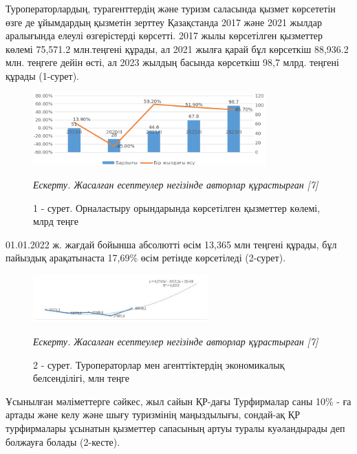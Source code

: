 \begin{multicols}{2}
Туроператорлардың, турагенттердің және туризм саласында қызмет
көрсететін өзге де ұйымдардың қызметін зерттеу Қазақстанда 2017 және
2021 жылдар аралығында елеулі өзгерістерді көрсетті. 2017 жылы
көрсетілген қызметтер көлемі 75,571.2 млн.теңгені құрады, ал 2021 жылға
қарай бұл көрсеткіш 88,936.2 млн. теңгеге дейін өсті, ал 2023 жылдың
басында көрсеткіш 98,7 млрд. теңгені құрады (1-сурет).
\end{multicols}

\begin{figure}[H]
	\centering
	\includegraphics[width=0.8\textwidth]{media/ekon/image6.1}
	\caption*{1 - сурет. Орналастыру орындарында көрсетілген қызметтер көлемі,
  млрд теңге}
  \emph{Ескерту. Жасалған есептеулер негізінде авторлар құрастырған {[}7{]}}
\end{figure}

01.01.2022 ж. жағдай бойынша абсолютті өсім 13,365 млн теңгені құрады,
бұл пайыздық арақатынаста 17,69\% өсім ретінде көрсетіледі (2-сурет).

\begin{figure}[H]
	\centering
	\includegraphics[width=0.6\textwidth]{media/ekon/image6.2}
	\caption*{2 - сурет. Туроператорлар мен агенттіктердің экономикалық
  белсенділігі, млн теңге}
  \emph{Ескерту. Жасалған есептеулер негізінде авторлар құрастырған {[}7{]}}
\end{figure}

\begin{multicols}{2}
Ұсынылған мәліметтерге сәйкес, жыл сайын ҚР-дағы Турфирмалар саны 10\% -
ға артады және келу және шығу туризмінің маңыздылығы, сондай-ақ ҚР
турфирмалары ұсынатын қызметтер сапасының артуы туралы куәландырады деп
болжауға болады (2-кесте).
\end{multicols}

